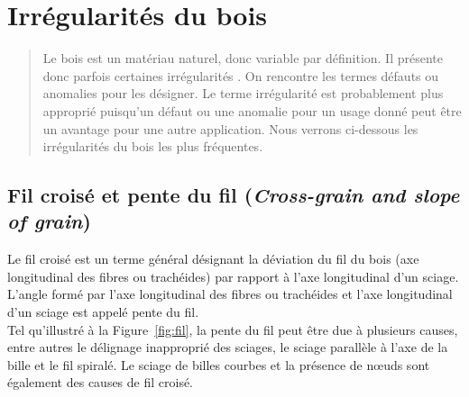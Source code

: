 \chapter{Irrégularités du bois}

\begin{abstract}
Le bois est un matériau naturel, donc variable par définition. Il présente donc parfois certaines  \og irrégularités  \fg. On rencontre les termes  \og défauts \fg ou  \og anomalies  \fg pour les désigner. Le terme irrégularité est probablement plus approprié puisqu'un défaut ou une anomalie pour un usage donné peut être un avantage pour une autre application. Nous verrons ci-dessous les irrégularités du bois les plus fréquentes.
\end{abstract}

\minitoc

\section{Fil croisé et pente du fil (\textit{Cross-grain and slope of grain})}

Le fil croisé est un terme général désignant la déviation du fil du bois (axe longitudinal des fibres ou trachéides) par rapport à l'axe longitudinal d'un sciage. L'angle formé par l'axe longitudinal des fibres ou trachéides et l'axe longitudinal d'un sciage est appelé pente du fil.\\

Tel qu'illustré à la Figure~\ref{fig:fil}, la pente du fil peut être due à plusieurs causes, entre autres le délignage inapproprié des sciages, le sciage parallèle à l'axe de la bille et le fil spiralé. Le sciage de billes courbes et la présence de nœuds sont également des causes de fil croisé. 


